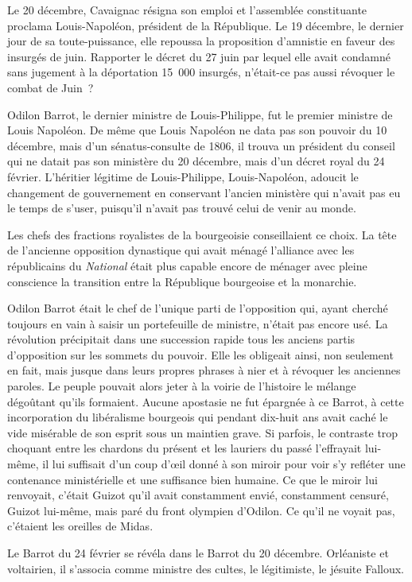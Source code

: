 \documentclass[french,twoside]{book} %
\begin{document}
Le 20 décembre, Cavaignac résigna son emploi et l’assemblée constituante proclama Louis-Napoléon, président de la République. Le 19 décembre, le dernier jour de sa toute-puissance, elle repoussa la proposition d’amnistie en faveur des insurgés de juin. Rapporter le décret du 27 juin par lequel elle avait condamné sans jugement à la déportation 15 000 insurgés, n’était-ce pas aussi révoquer le combat de Juin ?\par
Odilon Barrot, le dernier ministre de Louis-Philippe, fut le premier ministre de Louis Napoléon. De même que Louis Napoléon ne data pas son pouvoir du 10 décembre, mais d’un sénatus-consulte de 1806, il trouva un président du conseil qui ne datait pas son ministère du 20 décembre, mais d’un décret royal du 24 février. L’héritier légitime de Louis-Philippe, Louis-Napoléon, adoucit le changement de gouvernement en conservant l’ancien ministère qui n’avait pas eu le temps de s’user, puisqu’il n’avait pas trouvé celui de venir au monde.\par
Les chefs des fractions royalistes de la bourgeoisie conseillaient ce choix. La tête de l’ancienne opposition dynastique qui avait ménagé l’alliance avec les républicains du \emph{National} était plus capable encore de ménager avec pleine conscience la transition entre la République bourgeoise et la monarchie.\par
Odilon Barrot était le chef de l’unique parti de l’opposition qui, ayant cherché toujours en vain à saisir un portefeuille de ministre, n’était pas encore usé. La révolution précipitait dans une succession rapide tous les anciens partis d’opposition sur les sommets du pouvoir. Elle les obligeait ainsi, non seulement en fait, mais jusque dans leurs propres phrases à nier et à révoquer les anciennes paroles. Le peuple pouvait alors jeter à la voirie de l’histoire le mélange dégoûtant qu’ils formaient. Aucune apostasie ne fut épargnée à ce Barrot, à cette incorporation du libéralisme bourgeois qui pendant dix-huit ans avait caché le vide misérable de son esprit sous un maintien grave. Si parfois, le contraste trop choquant entre les chardons du présent et les lauriers du passé l’effrayait lui-même, il lui suffisait d’un coup d’œil donné à son miroir pour voir s’y refléter une contenance ministérielle et une suffisance bien humaine. Ce que le miroir lui renvoyait, c’était Guizot qu’il avait constamment envié, constamment censuré, Guizot lui-même, mais paré du front olympien d’Odilon. Ce qu’il ne voyait pas, c’étaient les oreilles de Midas.\par
Le Barrot du 24 février se révéla dans le Barrot du 20 décembre. Orléaniste et voltairien, il s’associa comme ministre des cultes, le légitimiste, le jésuite Falloux.\par
\end{document}

